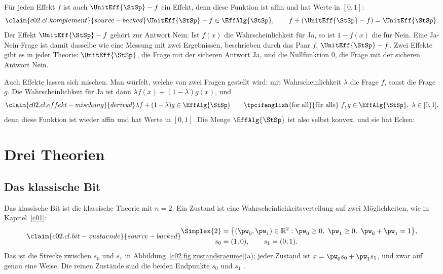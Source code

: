 
Für jeden Effekt $f$ ist auch $\UnitEff{\StSp} - f$ ein Effekt, denn diese Funktion ist
affin und hat Werte in $[0,1]$:
\begin{equation}\label{c02.eq.komplement}\claim{c02.cl.komplement}{source-backed}
  \UnitEff{\StSp} - f \in \EffAlg{\StSp},
  \qquad f + (\UnitEff{\StSp} - f) = \UnitEff{\StSp} .
\end{equation}
Der Effekt $\UnitEff{\StSp} - f$ gehört zur Antwort Nein: Ist $f(x)$ die Wahrscheinlichkeit
für Ja, so ist $1 - f(x)$ die für Nein. Eine Ja-Nein-Frage ist damit dasselbe wie eine
Messung mit zwei Ergebnissen, beschrieben durch das Paar $f$, $\UnitEff{\StSp} - f$. Zwei
Effekte gibt es in jeder Theorie: $\UnitEff{\StSp}$, die Frage mit der sicheren Antwort Ja,
und die Nullfunktion $0$, die Frage mit der sicheren Antwort Nein.

Auch Effekte lassen sich mischen. Man würfelt, welche von zwei Fragen gestellt wird: mit
Wahrscheinlichkeit $\lambda$ die Frage $f$, sonst die Frage $g$. Die Wahrscheinlichkeit
für Ja ist dann $\lambda f(x) + (1-\lambda) g(x)$, und
\begin{equation}\label{c02.eq.effekt-mischung}\claim{c02.cl.effekt-mischung}{derived}
  \lambda f + (1-\lambda) g \in \EffAlg{\StSp}
  \qquad \text{\tpcifenglish{for all}{für alle}}\ f, g \in \EffAlg{\StSp},\ \lambda \in [0,1] ,
\end{equation}
denn diese Funktion ist wieder affin und hat Werte in $[0,1]$. Die Menge
$\EffAlg{\StSp}$ ist also selbst konvex, und sie hat Ecken:


\section{Drei Theorien}\label{c02.s4}

\subsection{Das klassische Bit}\label{c02.s4.1}


Das klassische Bit ist die klassische Theorie mit $n = 2$. Ein Zustand ist eine
Wahrscheinlichkeitsverteilung auf zwei Möglichkeiten, wie in Kapitel~\ref{c01}:
\begin{equation}\label{c02.eq.bit}\claim{c02.cl.bit-zustaende}{source-backed}
  \begin{aligned}
    \Simplex{2} &= \bigl\{ (\pw_0, \pw_1) \in \mathbb{R}^2 : \pw_0 \geq 0,\ \pw_1 \geq 0,\ \pw_0 + \pw_1 = 1 \bigr\}, \\
    s_0 &= (1,0), \qquad s_1 = (0,1) .
  \end{aligned}
\end{equation}
Das ist die Strecke zwischen $s_0$ und $s_1$ in Abbildung~\ref{c02.fig.zustandsraeume}(a);
jeder Zustand ist $x = \pw_0 s_0 + \pw_1 s_1$, und zwar auf genau eine Weise. Die
reinen Zustände sind die beiden Endpunkte $s_0$ und $s_1$
.

